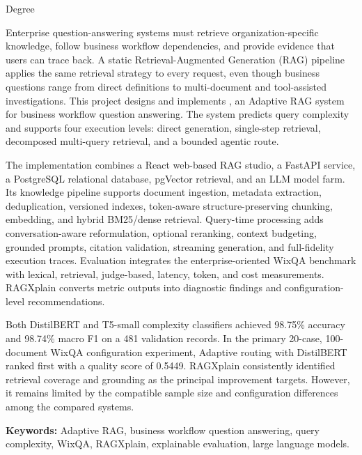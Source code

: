 \begin{center}
  {\Large\ReportTitle\par}
  \vspace{0.15cm}
  {\large\StudentName\par}
  \vspace{0.15cm}
  {\large Degree \DegreeName\par}
  \vspace{0.15cm}
  {\large\InstitutionName\par}
  \vspace{0.15cm}
  {\large\CopyrightYear\par}
\end{center}

\vspace{0.8cm}
{}
\vspace{0.8cm}

Enterprise question-answering systems must retrieve organization-specific
knowledge, follow business workflow dependencies, and provide evidence that users can
trace back. A static Retrieval-Augmented Generation (RAG) pipeline applies the
same retrieval strategy to every request, even though business questions range
from direct definitions to multi-document and tool-assisted investigations.
This project designs and implements \SystemName, an Adaptive RAG system for
business workflow question answering. The system predicts query complexity
and supports four execution levels: direct generation, single-step retrieval,
decomposed multi-query retrieval, and a bounded agentic route.

The implementation combines a React web-based RAG studio, a FastAPI service,
a PostgreSQL relational database, pgVector retrieval, and an LLM model farm.
Its knowledge pipeline supports
document ingestion, metadata extraction, deduplication, versioned indexes,
token-aware structure-preserving chunking, embedding, and hybrid BM25/dense
retrieval. Query-time processing adds conversation-aware reformulation,
optional reranking, context budgeting, grounded prompts, citation validation,
streaming generation, and full-fidelity execution traces. 
Evaluation integrates the enterprise-oriented WixQA benchmark with lexical, 
retrieval, judge-based, latency, token, and cost measurements. 
RAGXplain converts metric outputs into diagnostic findings and
configuration-level recommendations.

Both DistilBERT and T5-small complexity classifiers achieved 98.75\% accuracy and 98.74\%
macro F1 on a 481 validation records. In the primary 20-case, 
100-document WixQA configuration experiment,
Adaptive routing with DistilBERT ranked first with a quality score of 0.5449.
RAGXplain consistently identified retrieval coverage and grounding as the
principal improvement targets. However, it remains limited by the compatible sample size 
and configuration differences among the compared systems.

\noindent\textbf{Keywords:} Adaptive RAG, business workflow question
answering, query complexity, WixQA, RAGXplain, explainable
evaluation, large language models.
